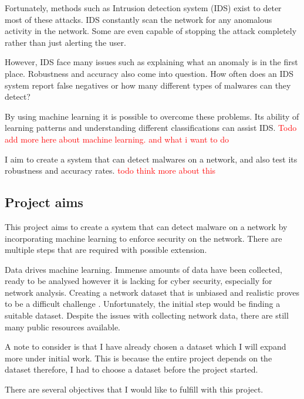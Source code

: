 \documentclass[11pt]{article}
\begin{document}
Fortunately, methods such as Intrusion detection system (IDS) exist to deter most of these attacks. IDS constantly scan the network for any anomalous activity in the network. Some are even capable of stopping the attack completely rather than just alerting the user. 

However, IDS face many issues such as explaining what an anomaly is in the first place. Robustness and accuracy also come into question. How often does an IDS system report false negatives or how many different types of malwares can they detect?

By using machine learning it is possible to overcome these problems. Its ability of learning patterns and understanding different classifications can assist IDS. \textcolor{red}{Todo add more here about machine learning. and what i want to do}

I aim to create a system that can detect malwares on a network, and also test its robustness and accuracy rates. \textcolor{red}{todo think more about this}

\subsection{Project aims}
This project aims to create a system that can detect malware on a network by incorporating machine learning to enforce security on the network. There are multiple steps that are required with possible extension.

Data drives machine learning. Immense amounts of data have been collected, ready to be analysed however it is lacking for cyber security, especially for network analysis. Creating a network dataset that is unbiased and realistic proves to be a difficult challenge \cite{dataset-evaluation}. Unfortunately, the initial step would be finding a suitable dataset. Despite the issues with collecting network data, there are still many public resources available. 

A note to consider is that I have already chosen a dataset which I will expand more under initial work. This is because the entire project depends on the dataset therefore, I had to choose a dataset before the project started. 

There are several objectives that I would like to fulfill with this project. 
\end{document}
